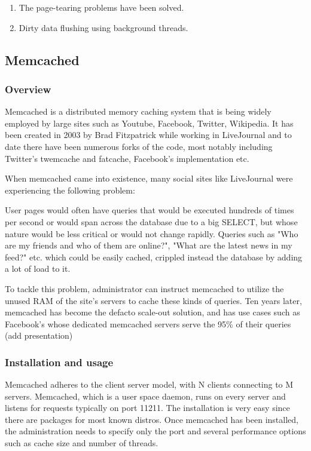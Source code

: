 \begin{enumerate}
	\item The page-tearing problems have been solved.
	\item Dirty data flushing using background threads.
\end{enumerate}

\subsection{Memcached}\label{sec:memcached-triad}

\subsubsection{Overview}

Memcached is a distributed memory caching system that is being widely employed 
by large sites such as Youtube, Facebook, Twitter, Wikipedia. It has been 
created in 2003 by Brad Fitzpatrick while working in LiveJournal and to date 
there have been numerous forks of the code, most notably including Twitter's 
twemcache and fatcache, Facebook's implementation etc.

When memcached came into existence, many social sites like LiveJournal were 
experiencing the following problem:

User pages would often have queries that would be executed hundreds of times 
per second or would span across the database due to a big SELECT, but whose 
nature would be less critical or would not change rapidly. Queries such as "Who 
are my friends and who of them are online?", "What are the latest news in my 
feed?" etc. which could be easily cached, crippled instead the database by 
adding a lot of load to it.

To tackle this problem, administrator can instruct memcached to utilize the 
unused RAM of the site's servers to cache these kinds of queries. Ten years 
later, memcached has become the defacto scale-out solution, and has use cases 
such as Facebook's whose dedicated memcached servers serve the 95\% of their 
queries (\fixme add presentation)

\subsubsection{Installation and usage}

Memcached adheres to the client server model, with N clients connecting to M 
servers. Memcached, which is a user space daemon, runs on every server and
listens for requests typically on port 11211. The installation is very easy 
since there are packages for most known distros. Once memcached has been 
installed, the administration needs to specify only the port and several 
performance options such as cache size and number of threads.

